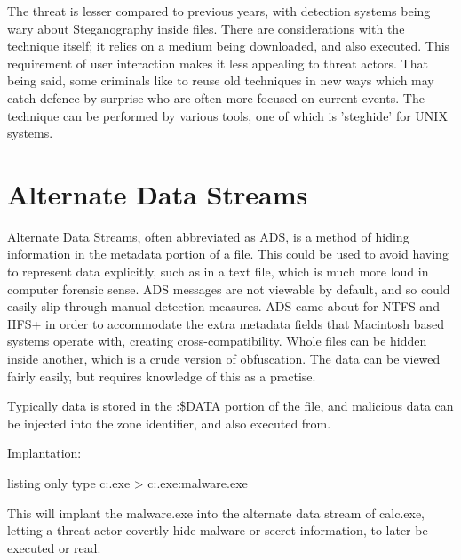 The threat is lesser compared to previous years, with detection systems being wary about Steganography inside files. There are considerations with the technique itself; it relies on a medium being downloaded, and also executed. This requirement of user interaction makes it less appealing to threat actors. 
That being said, some criminals like to reuse old techniques in new ways which may catch defence by surprise who are often more focused on current events. The technique can be performed by various tools, one of which is 'steghide' for UNIX systems.



\section{Alternate Data Streams}
Alternate Data Streams, often abbreviated as ADS, is a method of hiding information in the metadata portion of a file. This could be used to avoid having to represent data explicitly, such as in a text file, which is much more loud in computer forensic sense. ADS messages are not viewable by default, and so could easily slip through manual detection measures.
ADS came about for NTFS and HFS+ in order to accommodate the extra metadata fields that Macintosh based systems operate with, creating cross-compatibility. Whole files can be hidden inside another, which is a crude version of obfuscation. The data can be viewed fairly easily, but requires knowledge of this as a practise. \citep{ADS}

Typically data is stored in the :\$DATA portion of the file, and malicious data can be injected into the zone identifier, and also executed from.

Implantation:
\begin{tcblisting}{listing only}
    type c:\malware.exe > c:\Windows{}\calc.exe:malware.exe
\end{tcblisting}
\citep{ADS}


This will implant the malware.exe into the alternate data stream of calc.exe, letting a threat actor covertly hide malware or secret information, to later be executed or read.

